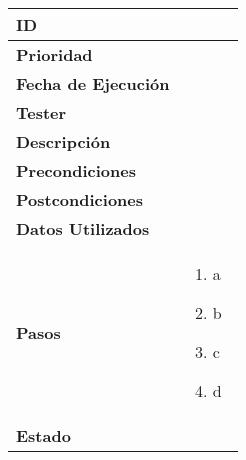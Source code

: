 \begin{longtable}{>{\raggedright\arraybackslash}p{4cm} p{11cm}}
    \hline
    \rowcolor{gray!20}
    \textbf{ID} & \\
    \hline
    \rowcolor{white}
    \textbf{Prioridad} & \\
    \hline
    \rowcolor{gray!20}
    \textbf{Fecha de Ejecución} & \\
    \hline
    \rowcolor{white}
    \textbf{Tester} & \\
    \hline
    \rowcolor{gray!20}
    \textbf{Descripción} & \\
    \hline
    \rowcolor{white}
    \textbf{Precondiciones} & \\
    \hline
    \rowcolor{gray!20}
    \textbf{Postcondiciones} & \\
    \hline
    \rowcolor{white}
    \textbf{Datos Utilizados} & \\
    \hline
    \rowcolor{gray!20}
    \textbf{Pasos} & \begin{enumerate}
        \item a
        \item b
        \item c
        \item d
    \end{enumerate}\\
    \hline
    \rowcolor{white}
    \textbf{Estado} & \\
    \hline
    \end{longtable}
    